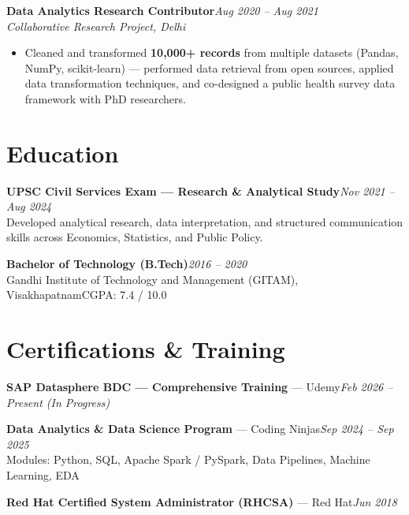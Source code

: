 \documentclass[10pt, letterpaper]{article}
\newcommand{\role}[3]{%
  \vspace{2pt}%
  {\bfseries #1}\hfill{\small\color{muted}\textit{#3}}\\[-2pt]%
  {\small\color{muted}\textit{#2}}%
}
\begin{document}
\role{Data Analytics Research Contributor}{Collaborative Research Project, Delhi}{Aug 2020 -- Aug 2021}

\begin{itemize}
  \item Cleaned and transformed \textbf{10,000+ records} from multiple datasets (Pandas, NumPy, scikit-learn) — performed data retrieval from open sources, applied data transformation techniques, and co-designed a public health survey data framework with PhD researchers.
\end{itemize}

\section{Education}

{\bfseries UPSC Civil Services Exam — Research \& Analytical Study}\hfill{\small\color{muted}\textit{Nov 2021 -- Aug 2024}}\\
{\small\color{muted}Developed analytical research, data interpretation, and structured communication skills across Economics, Statistics, and Public Policy.}

\vspace{2pt}
{\bfseries Bachelor of Technology (B.Tech)}\hfill{\small\color{muted}\textit{2016 -- 2020}}\\
{\small\color{muted}Gandhi Institute of Technology and Management (GITAM), Visakhapatnam\hfill CGPA: 7.4 / 10.0}

\section{Certifications \& Training}

{\bfseries SAP Datasphere BDC — Comprehensive Training} — Udemy\hfill{\small\color{muted}\textit{Feb 2026 -- Present \emph{(In Progress)}}}

\vspace{1pt}
{\bfseries Data Analytics \& Data Science Program} — Coding Ninjas\hfill{\small\color{muted}\textit{Sep 2024 -- Sep 2025}}\\
{\small\color{muted}Modules: Python, SQL, Apache Spark / PySpark, Data Pipelines, Machine Learning, EDA}

\vspace{1pt}
{\bfseries Red Hat Certified System Administrator (RHCSA)} — Red Hat\hfill{\small\color{muted}\textit{Jun 2018}}

\end{document}
